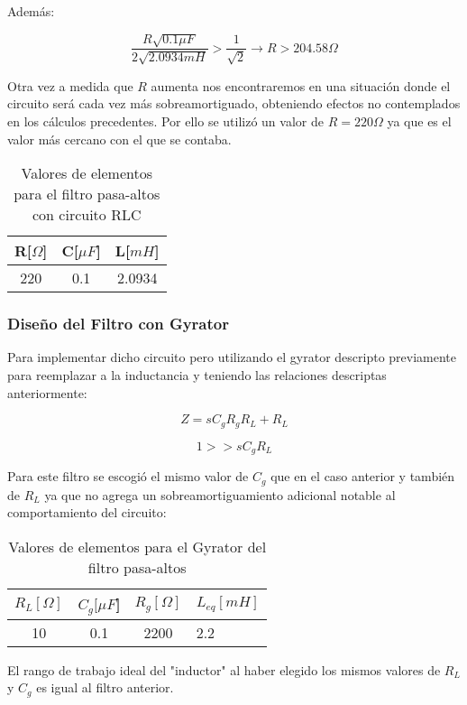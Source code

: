 Además:

$$\frac{R\sqrt{0.1\mu F}}{2\sqrt{2.0934mH}} > \frac{1}{\sqrt{2}} \longrightarrow R > 204.58 \Omega $$

Otra vez a medida que $R$ aumenta nos encontraremos en una situación donde el circuito será
cada vez más sobreamortiguado, obteniendo efectos no contemplados en los cálculos precedentes. 
Por ello se utilizó un valor de $R= 220 \Omega$ ya que es el valor más cercano con el que se contaba.

\begin{table}[H]
    \centering
    \begin{tabular}{|c|c|c|}
    \hline
    \rowcolor[HTML]{C0C0C0} 
    R[$\Omega$] & C[$\mu F$] & L[$mH$]  \\ \hline
    220     & 0.1  & 2.0934 \\ \hline
    \end{tabular}
    \caption{Valores de elementos para el filtro pasa-altos con circuito RLC}
    \end{table}

\subsubsection{Diseño del Filtro con Gyrator}

Para implementar dicho circuito pero utilizando el gyrator descripto previamente
para reemplazar a la inductancia y teniendo las relaciones descriptas anteriormente:

$$Z=sC_gR_gR_L+R_L$$

$$1 >> sC_gR_L$$

Para este filtro se escogió el mismo valor de $C_g$ que en el caso anterior y también de $R_L$ ya que no agrega un sobreamortiguamiento
adicional notable al comportamiento del circuito:

\begin{table}[H]
    \centering
    \begin{tabular}{|c|c|c|l|}
    \hline
    \rowcolor[HTML]{C0C0C0} 
    $R_L[\Omega]$ & $C_g[\mu F$] & $R_g[\Omega]$  & $L_{eq}[mH]$ \\ \hline
    10      & 0.1  & 2200 & 2.2        \\ \hline
    \end{tabular}
    \caption{Valores de elementos para el Gyrator del filtro pasa-altos}
    \end{table}


El rango de trabajo ideal del "inductor" al haber elegido los mismos valores de $R_L$ y $C_g$ es igual al filtro anterior.

